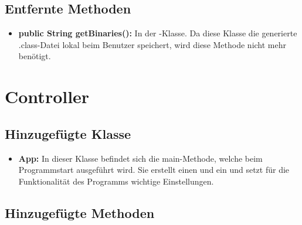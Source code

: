 \subsection{Entfernte Methoden}

\begin{itemize}
	\item \textbf{public String getBinaries():} In der -Klasse. Da diese Klasse die generierte .class-Datei lokal beim Benutzer speichert, wird diese Methode nicht mehr benötigt.
\end{itemize}


\section{Controller}

\subsection{Hinzugefügte Klasse}

\begin{itemize}
	\item \textbf{App:} In dieser Klasse befindet sich die main-Methode, welche beim Programmstart ausgeführt wird. Sie erstellt einen  und ein  und setzt für die Funktionalität des Programms wichtige Einstellungen.
\end{itemize}

\subsection{Hinzugefügte Methoden}

